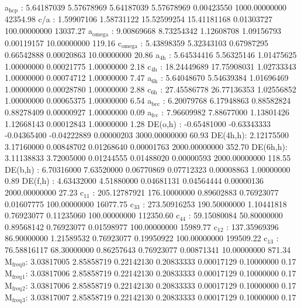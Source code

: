 \documentclass[11pt]{article}
\begin{document}
a\(_{\text{hcp}}\)   :   5.64187039   5.57678969   5.64187039   5.57678969   0.00423550 1000.00000000     42354.98
c/a     :   1.59907106   1.58731122  15.52599254  15.41181168   0.01303727 100.00000000     13037.27
a\(_{\text{omega}}\) :   9.00869668   8.73254342   1.12608708   1.09156793   0.00119157  10.00000000       119.16
c\(_{\text{omega}}\) :   5.43898359   5.32343103   0.67987295   0.66542888   0.00020863  10.00000000        20.86
a\(_{\text{4h}}\)    :   5.64534416   5.56325146   1.01475625   1.00000000   0.00021775   1.00000000         2.18
c\(_{\text{4h}}\)    :  18.24449689  17.75908031   1.02733343   1.00000000   0.00074712   1.00000000         7.47
a\(_{\text{6h}}\)    :   5.64048670   5.54639384   1.01696469   1.00000000   0.00028780   1.00000000         2.88
c\(_{\text{6h}}\)    :  27.45586778  26.77136353   1.02556852   1.00000000   0.00065375   1.00000000         6.54
a\(_{\text{bcc}}\)   :   6.20079768   6.17948863   0.88582824   0.88278409   0.00000927   1.00000000         0.09
a\(_{\text{fcc}}\)   :   7.96609982   7.88677000   1.13801426   1.12668143   0.00012843   1.00000000         1.28
DE(o,h) :  -0.65481000  -0.63343333  -0.04365400  -0.04222889   0.00000203 3000.00000000        60.93
DE(4h,h):   2.12175500   3.17160000   0.00848702   0.01268640   0.00001763 2000.00000000       352.70
DE(6h,h):   3.11138833   3.72005000   0.01244555   0.01488020   0.00000593 2000.00000000       118.55
DE(b,h) :   6.70316000   7.63520000   0.06770869   0.07712323   0.00008863   1.00000000         0.89
DE(f,h) :   4.63432000   4.51880000   0.04681131   0.04564444   0.00000136 2000.00000000        27.23
c\(_{\text{11}}\)    : 205.12787921 176.10000000   0.89602883   0.76923077   0.01607775 100.00000000     16077.75
c\(_{\text{33}}\)    : 273.50916253 190.50000000   1.10441818   0.76923077   0.11235060 100.00000000    112350.60
c\(_{\text{44}}\)    :  59.15080084  50.80000000   0.89568142   0.76923077   0.01598977 100.00000000     15989.77
c\(_{\text{12}}\)    : 137.35969396  86.90000000   1.21589532   0.76923077   0.19950922 100.00000000    199509.22
c\(_{\text{13}}\)    :  76.58816117  68.30000000   0.86257643   0.76923077   0.00871341  10.00000000       871.34
M\(_{\text{freq}}\)\(_{\text{0}}\):   3.03817005   2.85858719   0.22142130   0.20833333   0.00017129   0.10000000         0.17
M\(_{\text{freq}}\)\(_{\text{1}}\):   3.03817006   2.85858719   0.22142130   0.20833333   0.00017129   0.10000000         0.17
M\(_{\text{freq}}\)\(_{\text{2}}\):   3.03817006   2.85858719   0.22142130   0.20833333   0.00017129   0.10000000         0.17
M\(_{\text{freq}}\)\(_{\text{3}}\):   3.03817007   2.85858719   0.22142130   0.20833333   0.00017129   0.10000000         0.17
\end{document}
